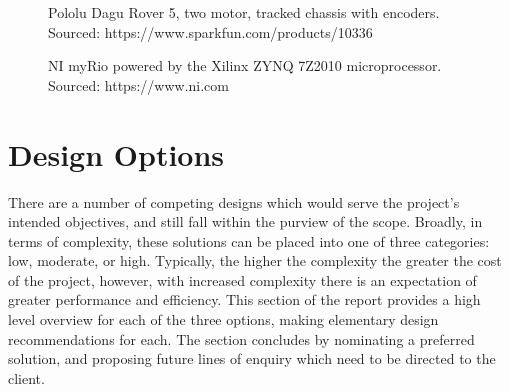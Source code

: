 \documentclass[a4paper]{article}
\begin{document}
\begin{figure}[h]
\centering
\begin{minipage}{0.45\textwidth}
\centering
{}
\caption{Pololu Dagu Rover 5, two motor, tracked chassis with encoders. Sourced: https://www.sparkfun.com/products/10336}
\end{minipage}
\hspace{1cm}
\begin{minipage}{0.45\textwidth}
\centering
{}
\caption{NI myRio powered by the Xilinx ZYNQ 7Z2010 microprocessor. Sourced: https://www.ni.com}
\end{minipage}
\end{figure}

\section{Design Options}
There are a number of competing designs which would serve the project's intended objectives, and still fall within the purview of the scope. Broadly, in terms of complexity, these solutions can be placed into one of three categories: low, moderate, or high. Typically, the higher the complexity the greater the cost of the project, however, with increased complexity there is an expectation of greater performance and efficiency. This section of the report provides a high level overview for each of the three options, making elementary design recommendations for each. The section concludes by nominating a preferred solution, and proposing future lines of enquiry which need to be directed to the client.
\end{document}
